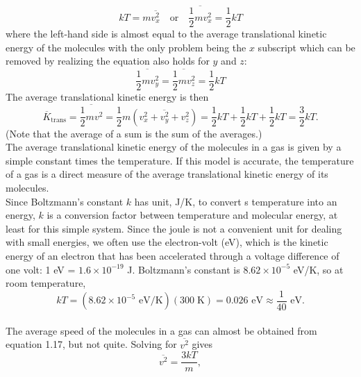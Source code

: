 \documentclass[11pt]{exam}
\begin{document}
\begin{equation}\tag{1.15}
kT = m\overline{v_x^2}\quad\text{or}\quad\overline{\frac{1}{2}mv_x^2} = \frac{1}{2}kT
\end{equation}
where the left-hand side is almost equal to the average translational kinetic energy of the molecules with the only problem being the $x$ subscript which can be removed by realizing the equation also holds for $y$ and $z$:
\begin{equation}\tag{1.16}
\overline{\frac{1}{2}mv_y^2} = \overline{\frac{1}{2}mv_z^2} = \frac{1}{2}kT
\end{equation}
The average translational kinetic energy is then 
\begin{equation}\tag{1.17}
\overline{K}_\text{trans}=\overline{\frac{1}{2}mv^2}= \frac{1}{2}m(\overline{v_x^2+v_y^2+v_z^2})=\frac{1}{2}kT + \frac{1}{2}kT +\frac{1}{2}kT = \frac{3}{2}kT.
\end{equation}
(Note that the average of a sum is the sum of the averages.)\\
\hspace*{10mm}The average translational kinetic energy of the molecules in a gas is given by a simple constant times the temperature. If this model is accurate, the temperature of a gas is a direct measure of the average translational kinetic energy of its molecules.\\
\hspace*{10mm}Since Boltzmann's constant $k$ has unit, J/K, to convert s temperature into an energy, $k$ is a conversion factor between temperature and molecular energy, at least for this simple system. Since the joule is not a convenient unit for dealing with small energies, we often use the electron-volt (eV), which is the kinetic energy of an electron that has been accelerated through a voltage difference of one volt: 1 eV = $1.6\times 10^{-19}$ J. Boltzmann's constant is $8.62\times 10^{-5}$ eV/K, so at room temperature, 
\begin{equation}\tag{1.19}
kT =  (8.62\times 10^{-5} \text{ eV/K})(300\;\text{K}) = 0.026 \text{ eV}\approx \frac{1}{40} \text{ eV}.
\end{equation}\\
\hspace*{10mm}The average speed of the molecules in a gas can almost be obtained from equation 1.17, but not quite. Solving for $\overline{v^2}$ gives 
\begin{equation}\tag{1.20}
\overline{v^2}=\frac{3kT}{m},   
\end{equation}
\end{document}
